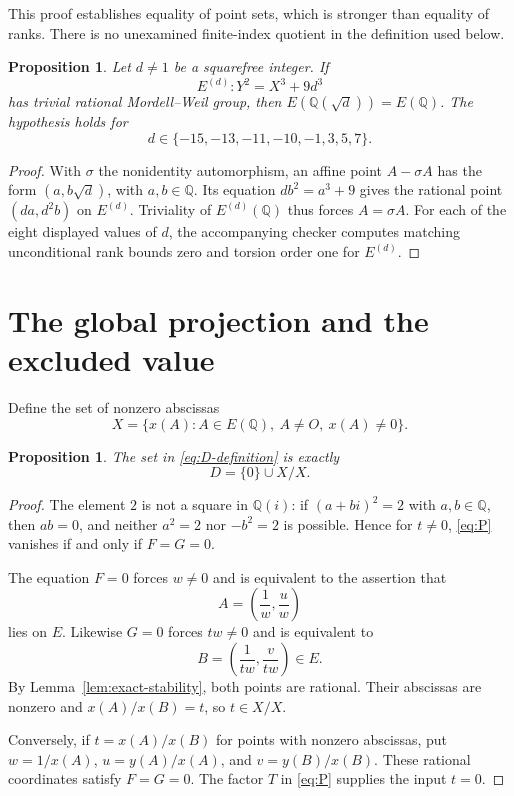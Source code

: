 \documentclass[11pt,a4paper]{article}
\newtheorem{proposition}[theorem]{Proposition}
\theoremstyle{definition}
\newcommand{\Q}{\mathbb Q}\newcommand{\Z}{\mathbb Z}
\begin{document}
This proof establishes equality of point sets, which is stronger than
equality of ranks. There is no unexamined finite-index quotient in the
definition used below.

\begin{proposition}\label{prop:quadratic-fields}
Let $d\ne1$ be a squarefree integer. If
\[
               E^{(d)}:Y^2=X^3+9d^3
\]
has trivial rational Mordell--Weil group, then
$E(\Q(\sqrt d))=E(\Q)$. The hypothesis holds for
\[
                   d\in\{-15,-13,-11,-10,-1,3,5,7\}.
\]
\end{proposition}
\begin{proof}
With $\sigma$ the nonidentity automorphism, an affine point
$A-\sigma A$ has the form $(a,b\sqrt d)$, with $a,b\in\Q$.
Its equation $db^2=a^3+9$ gives the rational point
$(da,d^2b)$ on $E^{(d)}$. Triviality of $E^{(d)}(\Q)$ thus forces
$A=\sigma A$. For each of the eight displayed values of $d$,
the accompanying checker computes matching unconditional rank
bounds zero and torsion order one for $E^{(d)}$.
\end{proof}

\section{The global projection and the excluded value}\label{sec:global}

Define the set of nonzero abscissas
\[
       X=\{x(A):A\in E(\Q),\ A\ne O,\ x(A)\ne0\}.
\]

\begin{proposition}\label{prop:ratio-identification}
The set in \eqref{eq:D-definition} is exactly
\[
                         D=\{0\}\cup X/X.
\]
\end{proposition}
\begin{proof}
The element $2$ is not a square in $\Q(i)$: if
$(a+bi)^2=2$ with $a,b\in\Q$, then $ab=0$, and neither
$a^2=2$ nor $-b^2=2$ is possible. Hence for $t\ne0$,
\eqref{eq:P} vanishes if and only if $F=G=0$.

The equation $F=0$ forces $w\ne0$ and is equivalent to the assertion
that
\[
                      A=\left(\frac1w,\frac uw\right)
\]
lies on $E$. Likewise $G=0$ forces $tw\ne0$ and is equivalent to
\[
                      B=\left(\frac1{tw},\frac v{tw}\right)\in E.
\]
By Lemma~\ref{lem:exact-stability}, both points are rational.
Their abscissas are nonzero and $x(A)/x(B)=t$, so $t\in X/X$.

Conversely, if $t=x(A)/x(B)$ for points with nonzero abscissas,
put $w=1/x(A)$, $u=y(A)/x(A)$, and $v=y(B)/x(B)$.
These rational coordinates satisfy $F=G=0$.
The factor $T$ in \eqref{eq:P} supplies the input $t=0$.
\end{proof}
\end{document}
